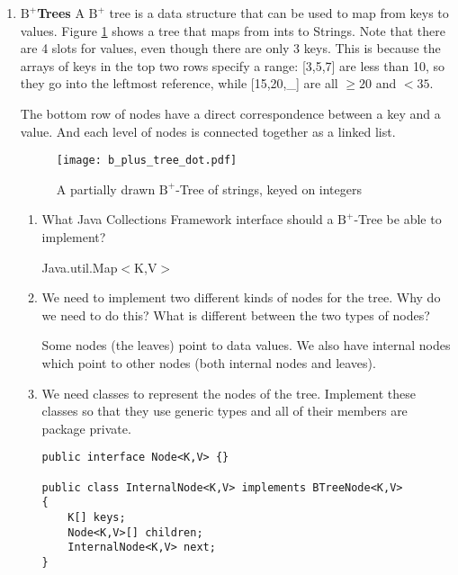 \documentclass[11pt]{article}
\newenvironment{answer}{\large\lstset{basicstyle=\large}\color{white}}{}
\newenvironment{answer}{\large\lstset{basicstyle=\large}\color{red}}{}
\begin{document}
\begin{enumerate}
\item{\bf $\textrm{B}^+$Trees} A $\textrm{B}^+$ tree is a data structure that
can be used to map from keys to values. Figure \ref{b-tree} shows a tree that
maps from ints to Strings. Note that there are 4 slots for values, even though
there are only 3 keys. This is because the arrays of keys in the top two rows
specify a range: [3,5,7] are less than 10, so they go into the leftmost
reference, while [15,20,\_] are all $\geq 20$ and $<35$.

The bottom row of nodes have a direct correspondence between a key and a value.
And each level of nodes is connected together as a linked list.

\begin{figure}
\caption{A partially drawn $\textrm{B}^+$-Tree of strings, keyed on integers}
\label{b-tree}
\center
\texttt{[image: b\_plus\_tree\_dot.pdf]}
\end{figure}

    \begin{enumerate}
    \item What Java Collections Framework interface should a
    $\textrm{B}^+$-Tree be able to implement?

        \begin{answer}
        Java.util.Map$<$K,V$>$
        \end{answer}

    \item We need to implement two different kinds of nodes for the tree. Why
    do we need to do this? What is different between the two types of nodes?

        \begin{answer}
        Some nodes (the leaves) point to data values. We also have internal
        nodes which point to other nodes (both internal nodes and leaves).
        \end{answer}

    \item We need classes to represent the nodes of the tree. Implement these
    classes so that they use generic types and all of their members are package
    private.

\begin{answer}
\begin{lstlisting}
public interface Node<K,V> {}

public class InternalNode<K,V> implements BTreeNode<K,V>
{
    K[] keys;
    Node<K,V>[] children;
    InternalNode<K,V> next;
}


\end{lstlisting}
\end{answer}
\end{enumerate}
\end{enumerate}
\end{document}
